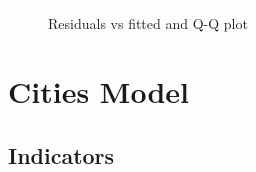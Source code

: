 \documentclass[12pt]{article}
\begin{document}
\begin{figure}[h!]
  \centering
  \includegraphics[width=\textwidth]{images/climate_model_conditions}
  \caption{\label{climate_model_conditions}Residuals vs fitted and Q-Q plot}
\end{figure}












\section{Cities Model}

\subsection{Indicators}
\end{document}
